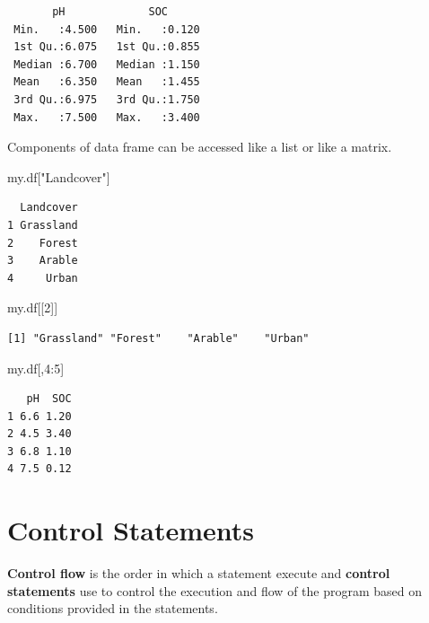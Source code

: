 \documentclass[
  letterpaper,
  DIV=11,
  numbers=noendperiod]{scrreprt}
\newenvironment{Shaded}{\begin{snugshade}}{\end{snugshade}}
\newcommand{\DecValTok}[1]{\textcolor[rgb]{0.68,0.00,0.00}{#1}}
\newcommand{\NormalTok}[1]{\textcolor[rgb]{0.00,0.23,0.31}{#1}}
\newcommand{\SpecialCharTok}[1]{\textcolor[rgb]{0.37,0.37,0.37}{#1}}
\newcommand{\StringTok}[1]{\textcolor[rgb]{0.13,0.47,0.30}{#1}}
\begin{document}
\begin{verbatim}
       pH             SOC       
 Min.   :4.500   Min.   :0.120  
 1st Qu.:6.075   1st Qu.:0.855  
 Median :6.700   Median :1.150  
 Mean   :6.350   Mean   :1.455  
 3rd Qu.:6.975   3rd Qu.:1.750  
 Max.   :7.500   Max.   :3.400  
\end{verbatim}

Components of data frame can be accessed like a list or like a matrix.

\begin{Shaded}
\begin{Highlighting}[]
\NormalTok{my.df[}\StringTok{"Landcover"}\NormalTok{]}
\end{Highlighting}
\end{Shaded}

\begin{verbatim}
  Landcover
1 Grassland
2    Forest
3    Arable
4     Urban
\end{verbatim}

\begin{Shaded}
\begin{Highlighting}[]
\NormalTok{my.df[[}\DecValTok{2}\NormalTok{]]}
\end{Highlighting}
\end{Shaded}

\begin{verbatim}
[1] "Grassland" "Forest"    "Arable"    "Urban"    
\end{verbatim}

\begin{Shaded}
\begin{Highlighting}[]
\NormalTok{my.df[,}\DecValTok{4}\SpecialCharTok{:}\DecValTok{5}\NormalTok{]}
\end{Highlighting}
\end{Shaded}

\begin{verbatim}
   pH  SOC
1 6.6 1.20
2 4.5 3.40
3 6.8 1.10
4 7.5 0.12
\end{verbatim}

\hypertarget{control-statements}{%
\section{Control Statements}\label{control-statements}}

\textbf{Control flow} is the order in which a statement execute and
\textbf{control statements} use to control the execution and flow of the
program based on conditions provided in the statements.
\end{document}
